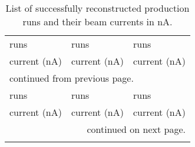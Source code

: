 \begin{center}
\begin{singlespacing}
\begin{longtable}{lr|lr|lr}
\caption[Production Run List]{\label{tab:data.cook.prodruns}List of successfully reconstructed production runs and their beam currents in nA.} \\

\hline \hline
\multicolumn{2}{l|}{runs} & \multicolumn{2}{l|}{runs} & \multicolumn{2}{l}{runs} \\
\multicolumn{2}{r|}{current (nA)} & \multicolumn{2}{r|}{current (nA)} & \multicolumn{2}{r}{current (nA)} \\
\hline
\endfirsthead

\multicolumn{6}{l}{\scriptsize continued from previous page.} \\
\hline
\multicolumn{2}{l|}{runs} & \multicolumn{2}{l|}{runs} & \multicolumn{2}{l}{runs} \\
\multicolumn{2}{r|}{current (nA)} & \multicolumn{2}{r|}{current (nA)} & \multicolumn{2}{r}{current (nA)} \\
\hline
\endhead

\hline
\multicolumn{6}{r}{\scriptsize continued on next page.} \\
\endfoot

\hline \hline
\endlastfoot


\end{longtable}
\end{singlespacing}
\end{center}
